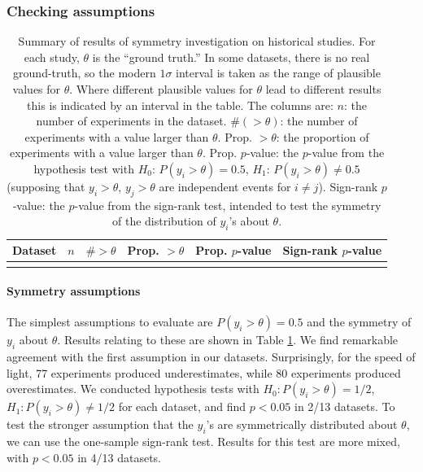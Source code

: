 \documentclass[12pt]{article}
\begin{document}
\subsubsection{Checking assumptions}


\begin{table}
  \centering
  \caption{Summary of results of symmetry investigation on historical studies. For each study, $\theta$ is the ``ground truth.'' In some datasets, there is no real ground-truth, so the modern $1\sigma$ interval is taken as the range of plausible values for $\theta$. Where different plausible values for $\theta$ lead to different results this is indicated by an interval in the table. The columns are: $n$: the number of experiments in the dataset. $\#(>\theta)$: the number of experiments with a value larger than $\theta$. Prop. $>\theta$: the proportion of experiments with a value larger than $\theta$. Prop. $p$-value: the $p$-value from the hypothesis test with $H_0$: $P(y_i>\theta)=0.5$, $H_1$: $P(y_i>\theta)\neq 0.5$ (supposing that $y_i>\theta$, $y_j>\theta$ are independent events for $i\neq j$). Sign-rank $p$-value: the $p$-value from the sign-rank test, intended to test the symmetry of the distribution of $y_i$'s about $\theta$.}
  \label{tab:hist-sym}
  \smaller
  \begin{tabular}{l|rcccc}
    \hline Dataset & $n$ & $\#>\theta$ & Prop. $>\theta$ & Prop. $p$-value & Sign-rank $p$-value \\\hline
    \\\hline
  \end{tabular}
\end{table}

\paragraph{Symmetry assumptions} The simplest assumptions to evaluate are $P(y_i>\theta)=0.5$ and the symmetry of $y_i$ about $\theta$. Results relating to these are shown in Table \ref{tab:hist-sym}. We find remarkable agreement with the first assumption in our datasets. Surprisingly, for the speed of light, 77 experiments produced underestimates, while 80 experiments produced overestimates. We conducted hypothesis tests with $H_0: P(y_i>\theta)=1/2$, $H_1: P(y_i>\theta)\neq 1/2$ for each dataset, and find $p<0.05$ in 2/13 datasets. To test the stronger assumption that the $y_i$'s are symmetrically distributed about $\theta$, we can use the one-sample sign-rank test. Results for this test are more mixed, with $p<0.05$ in 4/13 datasets.
\end{document}
